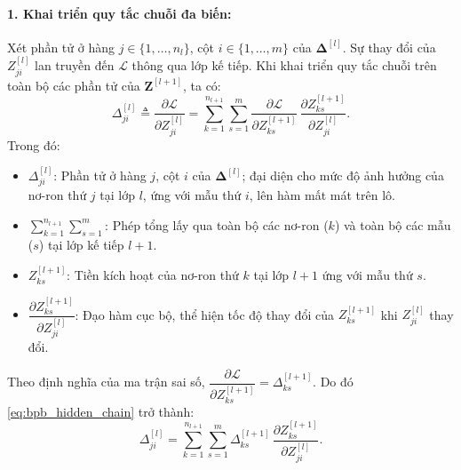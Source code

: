 \paragraph{1. Khai triển quy tắc chuỗi đa biến:}
Xét phần tử ở hàng $j \in \{1,\dots,n_l\}$, cột $i \in \{1,\dots,m\}$ của $\boldsymbol{\Delta}^{[l]}$. Sự thay đổi của $Z_{ji}^{[l]}$ lan truyền đến $\mathcal{L}$ thông qua lớp kế tiếp. Khi khai triển quy tắc chuỗi trên toàn bộ các phần tử của $\mathbf{Z}^{[l+1]}$, ta có:
\begin{equation}
\Delta_{ji}^{[l]} \triangleq \frac{\partial\mathcal{L}}{\partial Z_{ji}^{[l]}} = \sum_{k=1}^{n_{l+1}}\sum_{s=1}^{m} \frac{\partial\mathcal{L}}{\partial Z_{ks}^{[l+1]}}\,\frac{\partial Z_{ks}^{[l+1]}}{\partial Z_{ji}^{[l]}}.
\label{eq:bpb_hidden_chain}
\end{equation}
Trong đó:
\begin{itemize}
    \item $\Delta_{ji}^{[l]}$: Phần tử ở hàng $j$, cột $i$ của $\boldsymbol{\Delta}^{[l]}$; đại diện cho mức độ ảnh hưởng của nơ-ron thứ $j$ tại lớp $l$, ứng với mẫu thứ $i$, lên hàm mất mát trên lô.
    \item $\sum_{k=1}^{n_{l+1}}\sum_{s=1}^{m}$: Phép tổng lấy qua toàn bộ các nơ-ron ($k$) và toàn bộ các mẫu ($s$) tại lớp kế tiếp $l+1$.
    \item $Z_{ks}^{[l+1]}$: Tiền kích hoạt của nơ-ron thứ $k$ tại lớp $l+1$ ứng với mẫu thứ $s$.
    \item $\dfrac{\partial Z_{ks}^{[l+1]}}{\partial Z_{ji}^{[l]}}$: Đạo hàm cục bộ, thể hiện tốc độ thay đổi của $Z_{ks}^{[l+1]}$ khi $Z_{ji}^{[l]}$ thay đổi.
\end{itemize}
Theo định nghĩa của ma trận sai số, $\dfrac{\partial\mathcal{L}}{\partial Z_{ks}^{[l+1]}} = \Delta_{ks}^{[l+1]}$. Do đó \eqref{eq:bpb_hidden_chain} trở thành:
\begin{equation}
\Delta_{ji}^{[l]} = \sum_{k=1}^{n_{l+1}}\sum_{s=1}^{m} \Delta_{ks}^{[l+1]}\,\frac{\partial Z_{ks}^{[l+1]}}{\partial Z_{ji}^{[l]}}.
\label{eq:bpb_hidden_sub}
\end{equation}
 

